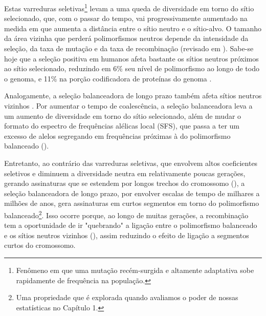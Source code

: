 \begin{refsection}
Estas varreduras seletivas\footnote{Fenômeno em que uma mutação recém-surgida e altamente adaptativa sobe rapidamente de frequência na população.} levam a uma queda de diversidade em torno do sítio selecionado, que, com o passar do tempo, vai progressivamente aumentado na medida em que aumenta a distância entre o sítio neutro e o sítio-alvo. O tamanho da área vizinha que perderá polimorfismos neutros depende da intensidade da seleção, da taxa de mutação e da taxa de recombinação (revisado em \cite{Bamshad2003}). Sabe-se hoje que a seleção positiva em humanos afeta bastante os sítios neutros próximos ao sítio selecionado, reduzindo em 6\% seu nível de polimorfismo ao longo de todo o genoma, e 11\% na porção codificadora de proteínas do genoma \parencite{Cai2009}. 



Analogamente, a seleção balanceadora de longo prazo também afeta sítios neutros vizinhos \parencite{Charlesworth2006}. Por aumentar o tempo de coalescência, a seleção balanceadora leva a um aumento de diversidade em torno do sítio selecionado, além de mudar o formato do espectro de frequências alélicas local (SFS), que passa a ter um excesso de alelos segregando em frequências próximas à do polimorfismo balanceado (\cite{Andres2009,Andres2011,Bamshad2003,Charlesworth2006}). 

Entretanto, ao contrário das varreduras seletivas, que envolvem altos coeficientes seletivos e diminuem a diversidade neutra em relativamente poucas gerações, gerando assinaturas que se estendem por longos trechos do cromossomo (\cite{Bamshad2003}), a seleção balanceadora de longo prazo, por envolver escalas de tempo de milhares a milhões de anos, gera assinaturas em curtos segmentos em torno do polimorfismo balanceado\footnote{Uma propriedade que é explorada quando avaliamos o poder de nossas estatísticas no Capítulo 1.}. Isso ocorre porque, ao longo de muitas gerações, a recombinação tem a oportunidade de ir "quebrando" a ligação entre o polimorfismo balanceado e os sítios neutros vizinhos (\cite{Andres2011,Charlesworth2006}), assim reduzindo o efeito de ligação a segmentos curtos do cromossomo. 
	

\end{refsection}
